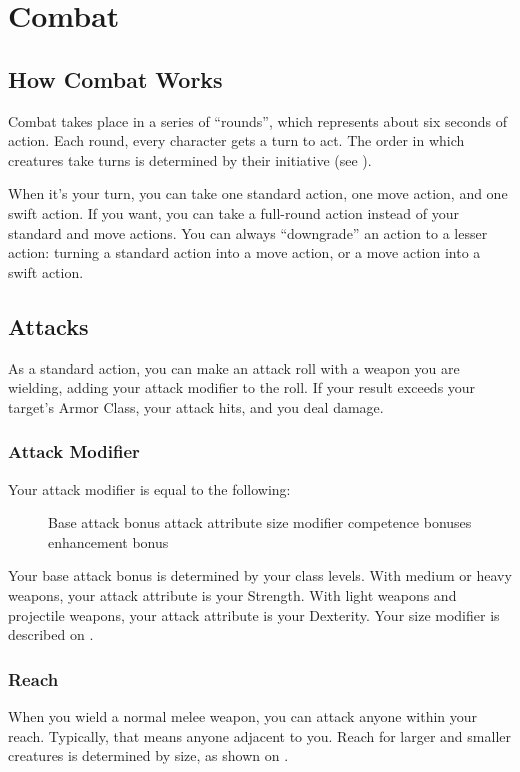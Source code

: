 \chapter{Combat}\label{Combat}

\section{How Combat Works}
Combat takes place in a series of ``rounds'', which represents about six seconds of action. Each round, every character gets a turn to act. The order in which creatures take turns is determined by their initiative (see ). 

When it's your turn, you can take one standard action, one move action, and one swift action. If you want, you can take a full-round action instead of your standard and move actions. You can always ``downgrade'' an action to a lesser action: turning a standard action into a move action, or a move action into a swift action.

\section{Attacks}
As a standard action, you can make an attack roll with a weapon you are wielding, adding your attack modifier to the roll. If your result exceeds your target's Armor Class, your attack hits, and you deal damage.

\subsection{Attack Modifier}
Your attack modifier is equal to the following:

\begin{figure}[h]
\centering Base attack bonus \add attack attribute \add size modifier \add competence bonuses \add enhancement bonus
\end{figure}

Your base attack bonus is determined by your class levels. With medium or heavy weapons, your attack attribute is your Strength. With light weapons and projectile weapons, your attack attribute is your Dexterity. Your size modifier is described on .

\subsection{Reach}
When you wield a normal melee weapon, you can attack anyone within your reach. Typically, that means anyone adjacent to you. Reach for larger and smaller creatures is determined by size, as shown on .

